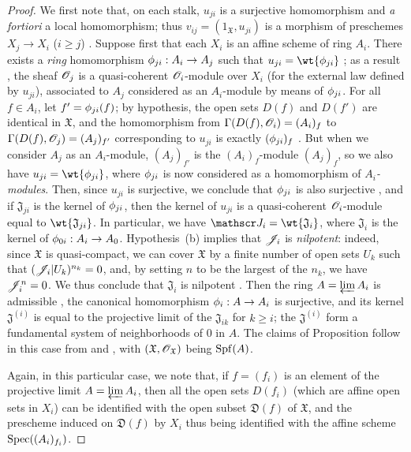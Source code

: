 \begin{proof}
\label{proof-1.10.6.3}
We first note that, on each stalk, $u_{ji}$ is a surjective homomorphism and \emph{a fortiori} a local homomorphism; thus $v_{ij}=(1_\mathfrak{X},u_{ji})$ is a morphism of preschemes $X_j\to X_i$ ($i\geq j$) .
Suppose first that each $X_i$ is an affine scheme of ring $A_i$.
There exists a \emph{ring} homomorphism $\vphi_{ji}:A_i\to A_j$ such that $u_{ji}=\wt{\vphi_{ji}}$ ; as a result , the sheaf $\mathscr{O}_j$ is a quasi-coherent $\mathscr{O}_i$-module over $X_i$ (for the external law defined by $u_{ji}$), associated to $A_j$ considered as an $A_i$-module by means of $\phi_{ji}$.
For all $f\in A_i$, let $f'=\phi_{ji}(f)$; by hypothesis, the open sets $D(f)$ and $D(f')$ are identical in $\mathfrak{X}$, and the homomorphism from $\Gamma(D(f),\mathscr{O}_i)=(A_i)_f$ to $\Gamma(D(f),\mathscr{O}_j)=(A_j)_{f'}$ corresponding to $u_{ji}$ is exactly $(\phi_{ji})_f$ .
But when we consider $A_j$ as an $A_i$-module, $(A_j)_{f'}$ is the $(A_i)_f$-module $(A_j)_f$, so we also have $u_{ji}=\wt{\vphi_{ji}}$, where $\phi_{ji}$ is now considered as a homomorphism of \emph{$A_i$-modules}.
Then, since $u_{ji}$ is surjective, we conclude that $\phi_{ji}$ is also surjective , and if $\mathfrak{J}_{ji}$ is the kernel of $\phi_{ji}$, then the kernel of $u_{ji}$ is a quasi-coherent $\mathscr{O}_i$-module equal to $\wt{\mathfrak{J}_{ji}}$.
In particular, we have $\sh{J}_i=\wt{\mathfrak{J}_i}$, where $\mathfrak{J}_i$ is the kernel of $\vphi_{0i}:A_i\to A_0$.
Hypothesis~(b) implies that $\mathscr{J}_i$ is \emph{nilpotent}: indeed, since $\mathfrak{X}$ is quasi-compact, we can cover $\mathfrak{X}$ by a finite number of open sets $U_k$ such that $(\mathscr{J}_i|U_k)^{n_k}=0$, and, by setting $n$ to be the largest of the $n_k$, we have $\mathscr{J}_i^n=0$.
We thus conclude that $\mathfrak{J}_i$ is nilpotent .
Then the ring $A=\varprojlim A_i$ is admissible , the canonical homomorphism $\vphi_i:A\to A_i$ is surjective, and its kernel $\mathfrak{J}^{(i)}$ is equal to the projective limit of the $\mathfrak{J}_{ik}$ for $k\geq i$; the $\mathfrak{J}^{(i)}$ form a fundamental system of neighborhoods of $0$ in $A$.
The claims of Proposition  follow in this case from  and , with $(\mathfrak{X},\mathscr{O}_\mathfrak{X})$ being $\operatorname{Spf}(A)$.

Again, in this particular case, we note that, if $f=(f_i)$ is an element of the projective limit $A=\varprojlim A_i$, then all the open sets $D(f_i)$ (which are affine open sets in $X_i$) can be identified with the open subset $\mathfrak{D}(f)$ of $\mathfrak{X}$, and the prescheme induced on $\mathfrak{D}(f)$ by $X_i$ thus being identified with the affine scheme $\operatorname{Spec}((A_i)_{f_i})$.


\end{proof}
